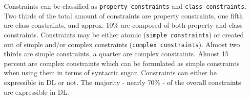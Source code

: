 \documentclass{llncs}
\newcommand{\ms}[1]{\texttt{#1}}
\newenvironment{evaluation-generic}{
  \scriptsize
  \sffamily
  \vspace{0cm}
	\begin{center}
  \begin{tabular}{l|c|c|c}
  \hline
  \textbf{constraint} & \textbf{property c.} & \textbf{simple c.} & \textbf{DL} \\
  \hline

}{
  \hline
  \end{tabular}
  \linebreak
	\end{center}
}
\begin{document}
Constraints can be classified as \ms{property constraints} and \ms{class constraints}.
Two thirds of the total amount of constraints are property constraints, one fifth are class constraints, and approx. 10\% are composed of both property and class constraints.
Constraints may be either atomic (\ms{simple constraints}) or created out of simple and/or complex constraints (\ms{complex constraints}).
Almost two thirds are simple constraints, a quarter are complex constraints.
Almost 15 percent are complex constraints which can be formulated as simple constraints when using them in terms of syntactic sugar.
Constraints can either be expressible in DL or not.
The majority - nearly 70\% - of the overall constraints are expressible in DL.

%
\end{document}
